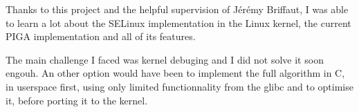 \documentclass[pdftex,a4paper,titlepage,11pt]{article}
\begin{document}
Thanks to this project and the helpful supervision of Jérémy Briffaut, I was
able to learn a lot about the SELinux implementation in the Linux kernel, the
current PIGA implementation and all of its features.

\bigskip

The main challenge I faced was kernel debuging and I did not solve it soon
engouh. An other option would have been to implement the full algorithm in C, in
userspace first, using only limited functionnality from the glibc and to
optimise it, before porting it to the kernel.

\bigskip


\newpage


{}


\nocite{*}
\end{document}
